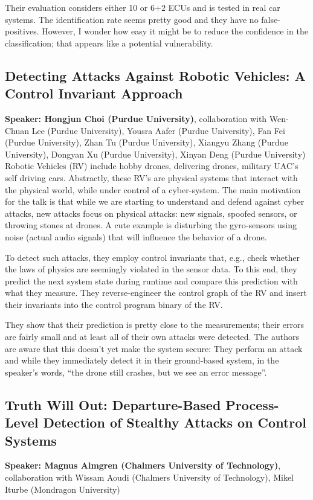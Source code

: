 \documentclass{article}
\begin{document}
Their evaluation considers either 10 or 6+2 ECUs and is tested in real car systems. The identification rate seems pretty good and they have no false-positives. However, I wonder how easy it might be to reduce the confidence in the classification; that appears like a potential vulnerability.

\subsection{Detecting Attacks Against Robotic Vehicles: A Control Invariant Approach}
\noindent\textbf{Speaker: Hongjun Choi (Purdue University)}, collaboration with Wen-Chuan Lee (Purdue University), Yousra Aafer (Purdue University), Fan Fei (Purdue University), Zhan Tu (Purdue University), Xiangyu Zhang (Purdue University), Dongyan Xu (Purdue University), Xinyan Deng (Purdue University)\\

Robotic Vehicles (RV) include hobby drones, delivering drones, military UAC's self driving cars. Abstractly, these RV's are physical systems that interact with the physical world, while under control of a cyber-system. The main motivation for the talk is that while we are starting to understand and defend against cyber attacks, new attacks focus on physical attacks: new signals, spoofed sensors, or throwing stones at drones. A cute example is disturbing the gyro-sensors using noise (actual audio signals) that will influence the behavior of a drone.

To detect such attacks, they employ control invariants that, e.g., check whether the laws of physics are seemingly violated in the sensor data. To this end, they predict the next system state during runtime and compare this prediction with what they measure. They reverse-engineer the control graph of the RV and insert their invariants into the control program binary of the RV.

They show that their prediction is pretty close to the measurements; their errors are fairly small and at least all of their own attacks were detected. The authors are aware that this doesn't yet make the system secure: They perform an attack and while they immediately detect it in their ground-based system, in the speaker's words, ``the drone still crashes, but we see an error message''.

\subsection{Truth Will Out: Departure-Based Process-Level Detection of Stealthy Attacks on Control Systems}
\noindent\textbf{Speaker: Magnus Almgren (Chalmers University of Technology)}, collaboration with Wissam Aoudi (Chalmers University of Technology), Mikel Iturbe (Mondragon University)\\
\end{document}
